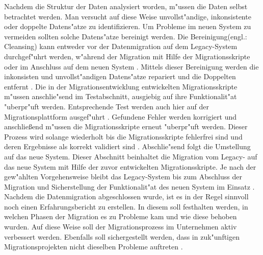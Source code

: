 \lb
Nachdem die Struktur der Daten analysiert worden, m"ussen die Daten selbst betrachtet werden. Man versucht auf diese Weise unvollst"andige, inkonsistente oder doppelte Datens"atze zu identifizieren. Um Probleme im neuen System zu vermeiden sollten solche Datens"atze bereinigt werden. Die Bereinigung(engl.: Cleansing) kann entweder vor der Datenmigration auf dem Legacy-System durchgef"uhrt werden, w"ahrend der Migration mit Hilfe der Migrationsskripte oder im Anschluss auf dem neuen System \citep[S~7f.]{klausMatthesSchulz-2012}. Mittels dieser Bereinigung werden die inkonsisten und unvollst"andigen Datens"atze repariert und die Doppelten entfernt \citep[S.~7f.]{rahm-2010}. 
\lb
Die in der Migrationsentwicklung entwickelten Migrationsskripte m"ussen anschlie"send im Testabschnitt, ausgiebig auf ihre Funktionalit"at "uberpr"uft werden. Entsprechende Test werden auch hier auf der Migrationsplattform ausgef"uhrt \citep[S.~8f]{klausMatthesSchulz-2012}. Gefundene Fehler werden korrigiert und anschließend m"ussen die Migrationsskripte erneut "uberpr"uft werden. Dieser Prozess wird solange wiederholt bis die Migrationsskripte fehlerfrei sind und deren Ergebnisse als korrekt validiert sind \citep[S.~8f]{klausMatthesSchulz-2012}.
\lb
Abschlie"send folgt die Umstellung auf das neue System. Dieser Abschnitt beinhaltet die Migration vom Legacy- auf das neue System mit Hilfe der zuvor entwickelten Migrationsskripte. Je nach der gew"ahlten Vorgehensweise bleibt das Legacy-System bis zum Abschluss der Migration und Sicherstellung der Funktionalit"at des neuen System im Einsatz \citep[S.~107]{bisbal-1999}. 
\lb
Nachdem die Datenmigration abgeschlossen wurde, ist es in der Regel sinnvoll noch einen Erfahrungsbericht zu erstellen. In diesem soll festhalten werden, in welchen Phasen der Migration es zu Probleme kam und wie diese behoben wurden. Auf diese Weise soll der Migrationsprozess im Unternehmen aktiv verbessert werden. Ebenfalls soll sichergestellt werden, dass in zuk"unftigen Migrationsprojekten nicht dieselben Probleme auftreten \citep[S.~10]{klausMatthesSchulz-2012}.



